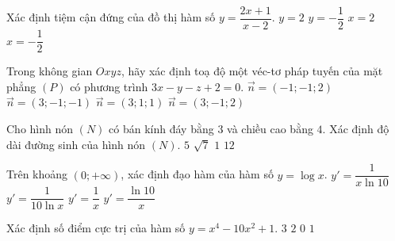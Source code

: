 \begin{ex}%
Xác định tiệm cận đứng của đồ thị hàm số $y=\dfrac{2x+1}{x-2}$.
\choice
{$y=2$}
{$y=-\dfrac{1}{2}$}
{\True $x=2$}
{$x=-\dfrac{1}{2}$}
\end{ex}
\begin{ex}%
	Trong không gian $Oxyz$, hãy xác định toạ độ một véc-tơ pháp tuyến của mặt phẳng $(P)$ có phương trình $3x-y-z+2=0$.
	\choice
	{$\vec{n}=(-1;-1;2)$}
	{\True $\vec{n}=(3;-1;-1)$}
	{$\vec{n}=(3;1;1)$}
	{$\vec{n}=(3;-1;2)$}
\end{ex}
\begin{ex}%
	Cho hình nón $(N)$ có bán kính đáy bằng $3$ và chiều cao bằng $4$. Xác định độ dài đường sinh của hình nón $(N)$.
	\choice
	{\True $5$}
	{$\sqrt{7}$}
	{$1$}
	{$12$}
\end{ex}
\begin{ex}%
	Trên khoảng $(0;+\infty)$, xác định đạo hàm của hàm số $y=\log x$.
	\choice
	{\True $y'=\dfrac{1}{x \ln 10}$}
	{$y'=\dfrac{1}{10 \ln x}$}
	{$y'=\dfrac{1}{x}$}
	{$y'=\dfrac{\ln 10}{x}$}
\end{ex}
\begin{ex}%
	Xác định số điểm cực trị của hàm số $y=x^4-10x^2+1$.
	\choice
	{\True $3$}
	{$2$}
	{$0$}
	{$1$}
\end{ex}
